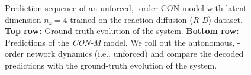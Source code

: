 \begin{figure}[hb]
    \caption{Prediction sequence of an unforced, -order \gls{CON} model with latent dimension $n_z=4$ trained on the reaction-diffusion (\emph{R-D}) dataset. 
    \textbf{Top row:} Ground-truth evolution of the system. \textbf{Bottom row:} Predictions of the \emph{CON-M} model.
    We roll out the autonomous, -order network dynamics (i.e., unforced) and compare the decoded predictions with the ground-truth evolution of the system.  
    }\label{fig:con:latent_dynamics:sequence_of_stills:r_d:rollout2}
\end{figure}